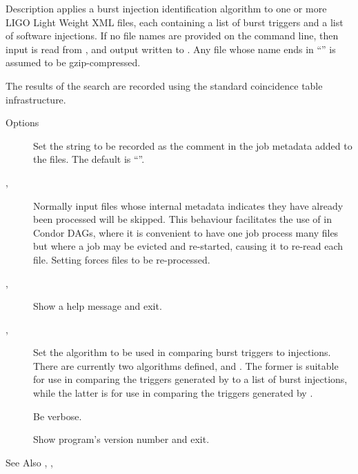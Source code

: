 \begin{manpage}{}



\begin{mansection}{Description}
 applies a burst injection identification algorithm
to one or more LIGO Light Weight XML files, each containing a list of burst
triggers and a list of software injections.  If no file names are provided
on the command line, then input is read from , and output
written to .  Any file whose name ends in ``'' is
assumed to be gzip-compressed.

The results of the search are recorded using the standard coincidence table
infrastructure.
\end{mansection}

\begin{mansection}{Options}
\begin{description}
\item[ ] Set the string to be recorded as
the comment in the job metadata added to the files.  The default is ``''.

\item[,] Normally input files whose internal
metadata indicates they have already been processed will be skipped.  This
behaviour facilitates the use of  in Condor DAGs,
where it is convenient to have one job process many files but where a job
may be evicted and re-started, causing it to re-read each file.  Setting
 forces files to be re-processed.

\item[,] Show a help message and exit.

\item[, ] Set
the algorithm to be used in comparing burst triggers to injections.  There
are currently two algorithms defined,  and
.  The former is suitable for use in comparing the
triggers generated by  to a list of burst injections,
while the latter is for use in comparing the triggers generated by
.

\item[] Be verbose.

\item[] Show program's version number and exit.

\end{description}
\end{mansection}

\begin{mansection}{See Also}
, , 
\end{mansection}

\end{manpage}
